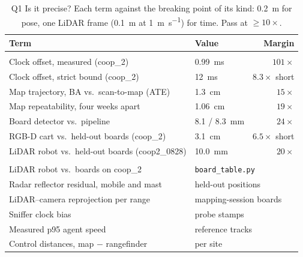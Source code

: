\begin{table}[t]
\centering
\caption{Q1 Is it precise? Each term against the breaking point of its
kind: \SI{0.2}{\metre} for pose, one LiDAR frame (\SI{0.1}{\metre} at
\SI{1}{\metre\per\second}) for time. Pass at $\geq 10\times$.}
\label{tab:res_q1}
\footnotesize
\setlength{\tabcolsep}{3pt}
\begin{tabularx}{\columnwidth}{@{}>{\raggedright\arraybackslash}X l r@{}}
\toprule
Term & Value & Margin \\
\midrule
\multicolumn{3}{@{}l}{\emph{Answered}} \\
Clock offset, measured (coop\_2) & \SI{0.99}{\milli\second} & $101\times$ \\
Clock offset, strict bound (coop\_2) & \SI{12}{\milli\second} & $8.3\times$ short \\
Map trajectory, BA vs.\ scan-to-map (ATE) & \SI{1.3}{\centi\metre} & $15\times$ \\
Map repeatability, four weeks apart & \SI{1.06}{\centi\metre} & $19\times$ \\
Board detector vs.\ pipeline & \SI{8.1}{} / \SI{8.3}{\milli\metre} & $24\times$ \\
RGB-D cart vs.\ held-out boards (coop\_2) & \SI{3.1}{\centi\metre} & $6.5\times$ short \\
LiDAR robot vs.\ held-out boards (coop2\_0828) & \SI{10.0}{\milli\metre} & $20\times$ \\
\midrule
\multicolumn{3}{@{}l}{\emph{Still needed}} \\
LiDAR robot vs.\ boards on coop\_2 & \multicolumn{2}{l}{\texttt{board\_table.py}} \\
Radar reflector residual, mobile and mast & \multicolumn{2}{l}{held-out positions} \\
LiDAR--camera reprojection per range & \multicolumn{2}{l}{mapping-session boards} \\
Sniffer clock bias & \multicolumn{2}{l}{probe stamps} \\
Measured p95 agent speed & \multicolumn{2}{l}{reference tracks} \\
Control distances, map $-$ rangefinder & \multicolumn{2}{l}{per site} \\
\bottomrule
\end{tabularx}
\end{table}
